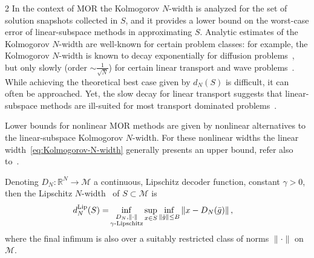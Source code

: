 \documentclass{article}
\newcommand{\M}{\mathcal{M}}                                %
\newcommand{\R}{\mathbb{R}}                                 %
\newcommand{\state}{x}
\begin{document}
\begin{multicols}{2}
In the context of MOR the Kolmogorov $N$-width is analyzed for the set of solution snapshots collected in $S$, and it provides a lower bound on the worst-case error of linear-subspace methods in approximating $S$. Analytic estimates of the Kolmogorov $N$-width are well-known for certain problem classes: for example, the Kolmogorov $N$-width is known to decay exponentially for diffusion problems~\cite{Bachmayr2010}, but only slowly (order $\sim\frac{1}{\sqrt{N}}$) for certain linear transport and wave problems~\cite{Greif2019}. While achieving the theoretical best case given by $d_N(S)$ is difficult, it can often be approached. Yet, the slow decay for linear transport suggests that linear-subspace methods are ill-suited for most transport dominated problems~\cite{Peherstorfer2022}.

Lower bounds for nonlinear MOR methods are given by nonlinear alternatives to the linear-subspace Kolmogorov $N$-width. For these nonlinear widths the linear width~\eqref{eq:Kolmogorov-N-width} generally presents an upper bound, refer also to~\cite{Cohen2023,Buchfink2023b}. 


Denoting $D_N:\R^N\rightarrow\M$ a continuous, Lipschitz decoder function, constant $\gamma > 0$, then the Lipschitz $N$-width~\cite{Petrova2021} of $S \subset \M$ is 
\begin{align}\label{eq:Lipschitz-N-width}
    d^{\textnormal{Lip}}_N(S) = & \inf_{\substack{D_N,\|\cdot\| \\ \gamma\textnormal{-Lipschitz}}} \sup_{\state \in S} \inf_{\|\bar{g}\| \leq B} \| \state - D_N (\bar{g})\| \,,
\end{align}
where the final infimum is also over a suitably restricted class of norms $\|\cdot\|$ on $\M$.


\end{multicols}
\end{document}
